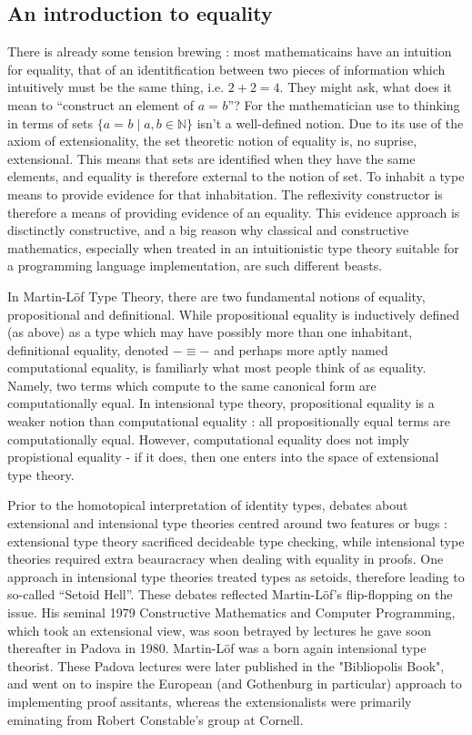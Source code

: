 \documentclass[11pt, a4paper]{article}
\newcommand{\id}[3][]{\ensuremath{#2 =_{#1} #3}\xspace}
\begin{document}
\subsection{An introduction to equality}

There is already some tension brewing : most mathematicains have an intuition
for equality, that of an identitfication between two pieces of information
which intuitively must be the same thing, i.e. $2+2=4$. They might ask, what
does it mean to ``construct an element of $\id{a}{b}$''? For the mathematician
use to thinking in terms of sets $\{\id{a}{b} \mid a,b \in \mathbb{N} \}$ isn't
a well-defined notion. Due to its use of the axiom of extensionality, the set
theoretic notion of equality is, no suprise, extensional.  This means that sets
are identified when they have the same elements, and equality is therefore
external to the notion of set. To inhabit a type means to provide evidence for
that inhabitation. The reflexivity constructor is therefore a means of
providing evidence of an equality. This evidence approach is disctinctly
constructive, and a big reason why classical and constructive mathematics,
especially when treated in an intuitionistic type theory suitable for a
programming language implementation, are such different beasts.

In Martin-Löf Type Theory, there are two fundamental notions of equality,
propositional and definitional.  While propositional equality is inductively
defined (as above) as a type which may have possibly more than one inhabitant,
definitional equality, denoted $-\equiv -$ and perhaps more aptly named
computational equality, is familiarly what most people think of as equality.
Namely, two terms which compute to the same canonical form are computationally
equal. In intensional type theory, propositional equality is a weaker notion
than computational equality : all propositionally equal terms are
computationally equal. However, computational equality does not imply
propistional equality - if it does, then one enters into the space of
extensional type theory. 

Prior to the homotopical interpretation of identity types, debates about
extensional and intensional type theories centred around two features or bugs :
extensional type theory sacrificed decideable type checking, while intensional
type theories required extra beauracracy when dealing with equality in proofs.
One approach in intensional type theories treated types as setoids, therefore
leading to so-called ``Setoid Hell''. These debates reflected Martin-Löf's
flip-flopping on the issue. His seminal 1979 Constructive Mathematics and
Computer Programming, which took an extensional view, was soon betrayed by
lectures he gave soon thereafter in Padova in 1980.  Martin-Löf was a born
again intensional type theorist.  These Padova lectures were later published in
the "Bibliopolis Book", and went on to inspire the European (and Gothenburg in
particular) approach to implementing proof assitants, whereas the
extensionalists were primarily eminating from Robert Constable's group at
Cornell. 
\end{document}
